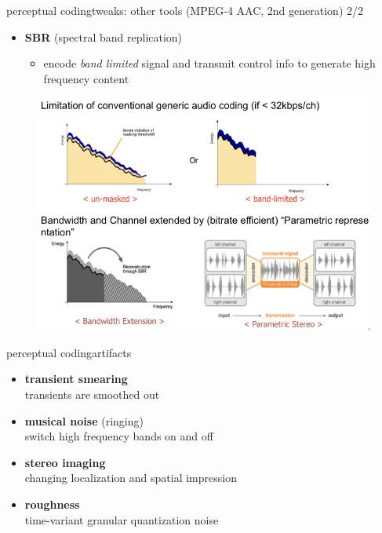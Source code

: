     \begin{frame}{perceptual coding}{tweaks: other tools (MPEG-4 AAC, 2nd generation) 2/2}
        \vspace{-3mm}
        \begin{itemize}
            \item	\textbf{SBR} (spectral band replication)
                \begin{itemize}
                    \item encode \textit{band limited} signal and transmit control info to generate high frequency content
                \end{itemize}
		\end{itemize}
        \begin{figure}
            \includegraphics[scale=.5]{graph/sbr}
        \end{figure}
	\end{frame}
	
	\begin{frame}{perceptual coding}{artifacts}
		\begin{itemize}
			\item	\textbf{transient smearing}\\
					transients are smoothed out
			\smallskip
            \item	\textbf{musical noise} (ringing)\\
					switch high frequency bands on and off
			\smallskip
            \item	\textbf{stereo imaging}\\
					changing localization and spatial impression
			\smallskip
            \item	\textbf{roughness}\\
					time-variant granular quantization noise
		\end{itemize}
	\end{frame}

